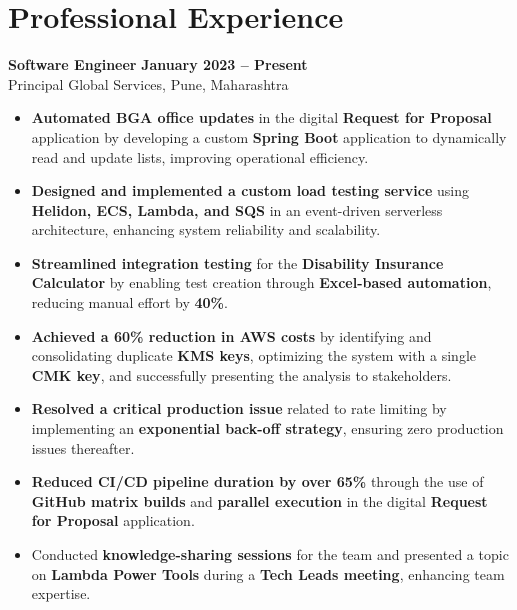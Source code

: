 \documentclass[a4paper,10pt]{article}
\begin{document}
\section*{Professional Experience}
\textbf{Software Engineer} \hfill \textbf{January 2023 -- Present} \\
Principal Global Services, Pune, Maharashtra
\begin{itemize}[left=0em]
    \item \textbf{Automated BGA office updates} in the digital \textbf{Request for Proposal} application by developing a custom \textbf{Spring Boot} application to dynamically read and update lists, improving operational efficiency.
    \item \textbf{Designed and implemented a custom load testing service} using \textbf{Helidon, ECS, Lambda, and SQS} in an event-driven serverless architecture, enhancing system reliability and scalability.
    \item \textbf{Streamlined integration testing} for the \textbf{Disability Insurance Calculator} by enabling test creation through \textbf{Excel-based automation}, reducing manual effort by \textbf{40\%}.
    \item \textbf{Achieved a 60\% reduction in AWS costs} by identifying and consolidating duplicate \textbf{KMS keys}, optimizing the system with a single \textbf{CMK key}, and successfully presenting the analysis to stakeholders.
    \item \textbf{Resolved a critical production issue} related to rate limiting by implementing an \textbf{exponential back-off strategy}, ensuring zero production issues thereafter.
    \item \textbf{Reduced CI/CD pipeline duration by over 65\%} through the use of \textbf{GitHub matrix builds} and \textbf{parallel execution} in the digital \textbf{Request for Proposal} application.
    \item Conducted \textbf{knowledge-sharing sessions} for the team and presented a topic on \textbf{Lambda Power Tools} during a \textbf{Tech Leads meeting}, enhancing team expertise.
    \end{itemize}
\end{document}
